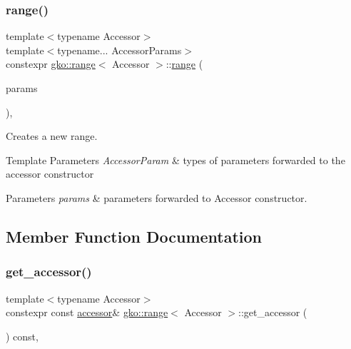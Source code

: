 \subsubsection{\texorpdfstring{range()}{range()}}
{\footnotesize\ttfamily template$<$typename Accessor$>$ \\
template$<$typename... Accessor\+Params$>$ \\
constexpr \hyperlink{classgko_1_1range}{gko\+::range}$<$ Accessor $>$\+::\hyperlink{classgko_1_1range}{range} (\begin{DoxyParamCaption}\item[{Accessor\+Params \&\&...}]{params }\end{DoxyParamCaption})\hspace{0.3cm}{\ttfamily [inline]}, {\ttfamily [explicit]}}



Creates a new range. 


\begin{DoxyTemplParams}{Template Parameters}
{\em Accessor\+Param} & types of parameters forwarded to the accessor constructor\\
\hline
\end{DoxyTemplParams}

\begin{DoxyParams}{Parameters}
{\em params} & parameters forwarded to Accessor constructor. \\
\hline
\end{DoxyParams}


\subsection{Member Function Documentation}
\mbox{\label{classgko_1_1range_ac62f76256fce7442670275827e32d506}} 
\subsubsection{\texorpdfstring{get\+\_\+accessor()}{get\_accessor()}}
{\footnotesize\ttfamily template$<$typename Accessor$>$ \\
constexpr const \hyperlink{classgko_1_1range_a3332728e51dadcf6517847cef3000a17}{accessor}\& \hyperlink{classgko_1_1range}{gko\+::range}$<$ Accessor $>$\+::get\+\_\+accessor (\begin{DoxyParamCaption}{ }\end{DoxyParamCaption}) const\hspace{0.3cm}{\ttfamily [inline]}, {\ttfamily [noexcept]}}



